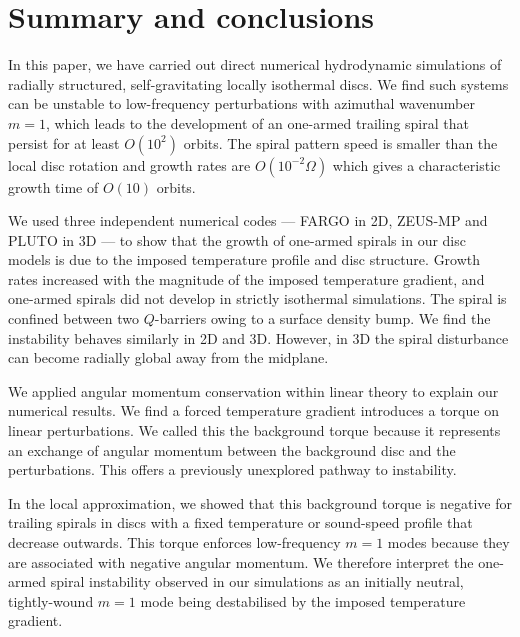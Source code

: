
\section{Summary and conclusions}\label{summary}
In this paper, we have carried out direct numerical hydrodynamic
simulations of radially structured, self-gravitating locally
isothermal discs.     
We find such systems can be unstable to low-frequency perturbations
with azimuthal wavenumber $m=1$, which leads to the development of an one-armed 
trailing spiral that persist for at least $O(10^2)$ orbits. The spiral
pattern speed is smaller than the local disc rotation and
growth rates are $O(10^{-2}\Omega)$ which gives a characteristic
growth time of $O(10)$ orbits.   

We used three independent numerical codes --- FARGO in 2D, ZEUS-MP and
PLUTO in 3D --- to show that the growth of  
one-armed spirals in our disc models is due to the imposed temperature 
profile and disc structure. Growth rates increased 
with the magnitude of the imposed temperature gradient, and one-armed
spirals did not develop in strictly isothermal simulations. The spiral
is confined between two $Q$-barriers owing to a surface density bump. 
We find the instability behaves similarly in 2D and 3D. However, in 3D
the spiral disturbance can become radially global away from 
the midplane.  

We applied angular momentum conservation within linear theory to
explain our numerical results. We find a   
forced temperature gradient introduces a torque on linear 
perturbations. We called this the background torque because it
represents an exchange of angular momentum between the background disc
and the perturbations. This offers a previously unexplored pathway to
instability. 

In the local approximation, we showed that this background torque is
negative for trailing spirals in discs with a fixed temperature or
sound-speed profile that decrease outwards. This torque enforces  
low-frequency $m=1$ modes because they are associated with negative
angular momentum. We therefore interpret the one-armed spiral instability
observed in our simulations as an initially neutral, tightly-wound
$m=1$ mode being destabilised by the imposed temperature gradient. 
   

